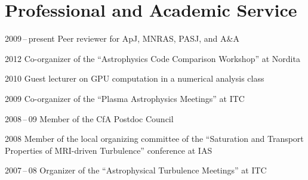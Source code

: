 \section*{Professional and Academic Service}

\begin{tlist}

\item[2009\,--\,present] Peer reviewer for ApJ, MNRAS, PASJ, and A\&A

\item[2012] Co-organizer of the ``Astrophysics Code Comparison Workshop'' at Nordita

\item[2010] Guest lecturer on GPU computation in a numerical analysis class

\item[2009] Co-organizer of the ``Plasma Astrophysics Meetings'' at ITC

\item[2008\,--\,09] Member of the CfA Postdoc Council

\item[2008] Member of the local organizing committee of the ``Saturation and Transport Properties of MRI-driven Turbulence'' conference at IAS

\item[2007\,--\,08] Organizer of the ``Astrophysical Turbulence Meetings'' at ITC

\end{tlist}
